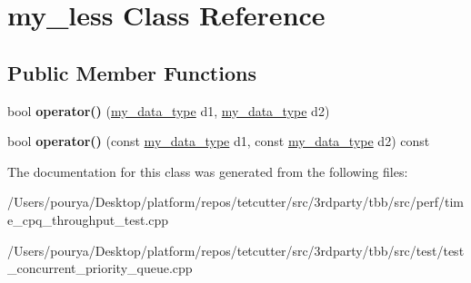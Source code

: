 \hypertarget{classmy__less}{}\section{my\+\_\+less Class Reference}
\label{classmy__less}
\subsection*{Public Member Functions}
\begin{DoxyCompactItemize}
\item 
\hypertarget{classmy__less_a331e0ca85354bbfbf0d81b73ff459ea0}{}bool {\bfseries operator()} (\hyperlink{classmy__data__type}{my\+\_\+data\+\_\+type} d1, \hyperlink{classmy__data__type}{my\+\_\+data\+\_\+type} d2)\label{classmy__less_a331e0ca85354bbfbf0d81b73ff459ea0}

\item 
\hypertarget{classmy__less_aeddad5c66cc8448d4c0060e461fd64b2}{}bool {\bfseries operator()} (const \hyperlink{classmy__data__type}{my\+\_\+data\+\_\+type} d1, const \hyperlink{classmy__data__type}{my\+\_\+data\+\_\+type} d2) const \label{classmy__less_aeddad5c66cc8448d4c0060e461fd64b2}

\end{DoxyCompactItemize}


The documentation for this class was generated from the following files\+:\begin{DoxyCompactItemize}
\item 
/\+Users/pourya/\+Desktop/platform/repos/tetcutter/src/3rdparty/tbb/src/perf/time\+\_\+cpq\+\_\+throughput\+\_\+test.\+cpp\item 
/\+Users/pourya/\+Desktop/platform/repos/tetcutter/src/3rdparty/tbb/src/test/test\+\_\+concurrent\+\_\+priority\+\_\+queue.\+cpp\end{DoxyCompactItemize}
